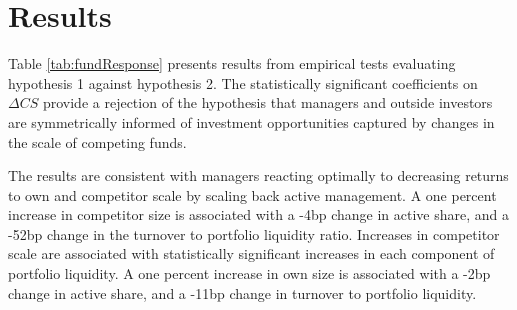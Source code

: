 \documentclass[openany]{book}
\theoremstyle{definition}
\theoremstyle{definition}
\theoremstyle{definition}
\theoremstyle{remark}
\begin{document}
\hypertarget{results}{%
\section{Results}\label{results}}

Table \ref{tab:fundResponse} presents results from empirical tests
evaluating hypothesis 1 against hypothesis 2. The statistically
significant coefficients on \(\Delta CS\) provide a rejection of the
hypothesis that managers and outside investors are symmetrically
informed of investment opportunities captured by changes in the scale of
competing funds.

The results are consistent with managers reacting optimally to
decreasing returns to own and competitor scale by scaling back active
management. A one percent increase in competitor size is associated with
a -4bp change in active share, and a -52bp change in the turnover to
portfolio liquidity ratio. Increases in competitor scale are associated
with statistically significant increases in each component of portfolio
liquidity. A one percent increase in own size is associated with a -2bp
change in active share, and a -11bp change in turnover to portfolio
liquidity.
\end{document}
